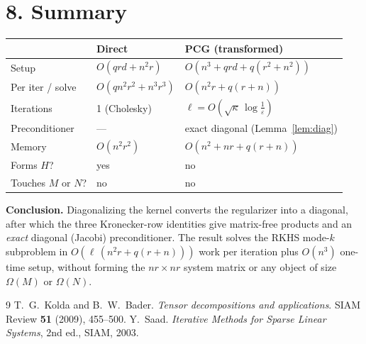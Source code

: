\documentclass[11pt]{article}
\begin{document}
\section*{8. Summary}

\begin{center}\small
\begin{tabular}{@{}lll@{}}\toprule
 & Direct & PCG (transformed) \\\midrule
Setup & $O(qrd+n^2r)$ & $O(n^3+qrd+q(r^2+n^2))$ \\
Per iter / solve & $O(qn^2r^2+n^3r^3)$ & $O(n^2r+q(r+n))$ \\
Iterations & 1 (Cholesky) & $\ell=O(\sqrt{\kappa}\,\log\tfrac1\varepsilon)$ \\
Preconditioner & --- & exact diagonal (Lemma~\ref{lem:diag}) \\
Memory & $O(n^2r^2)$ & $O(n^2+nr+q(r+n))$ \\
Forms $H$? & yes & no \\
Touches $M$ or $N$? & no & no \\
\bottomrule\end{tabular}\end{center}

\medskip
\noindent\textbf{Conclusion.} Diagonalizing the kernel converts the
regularizer into a diagonal, after which the three Kronecker-row identities
give matrix-free products and an \emph{exact} diagonal (Jacobi) preconditioner.
The result solves the RKHS mode-$k$ subproblem in
$O(\ell\,(n^2r+q(r+n)))$ work per iteration plus $O(n^3)$ one-time setup,
without forming the $nr\times nr$ system matrix or any object of size
$\Omega(M)$ or $\Omega(N)$.

\begin{thebibliography}{9}
 T.~G.~Kolda and B.~W.~Bader.
  \emph{Tensor decompositions and applications}.
  SIAM Review \textbf{51} (2009), 455--500.
 Y.~Saad.
  \emph{Iterative Methods for Sparse Linear Systems}, 2nd ed., SIAM, 2003.
\end{thebibliography}
\end{document}
